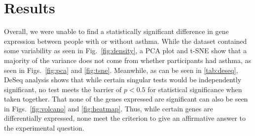 \documentclass[pdflatex,sn-mathphys]{sn-jnl}%
\theoremstyle{thmstyleone}%
\theoremstyle{thmstyletwo}%
\newcommand{\betterref}[1]{\IfBeginWith{#1}{fig:}{Fig.~}{Table~}\ref{#1}}
\theoremstyle{thmstylethree}%
\begin{document}
\section{Results}\label{sec3}
Overall, we were unable to find a statistically significant difference in gene expression between people with or without asthma. While the dataset contained some variability as seen in Fig.~\ref{fig:density}, a PCA plot and t-SNE show that a majority of the variance does not come from whether participants had asthma, as seen in Figs.~\ref{fig:pca} and \ref{fig:tsne}.  Meanwhile, as can be seen in \betterref{tab:deseq}, DeSeq analysis shows that while certain singular tests would be independently significant, no test meets the barrier of $p < 0.5$ for statistical significance when taken together. That none of the genes expressed are significant can also be seen in Figs.~\ref{fig:volcano} and \ref{fig:heatmap}. Thus, while certain genes are differentially expressed, none meet the criterion to give an affirmative answer to the experimental question. \\
\begin{table}[H]
    \centering
    \caption{DeSeq data showing statistical significance of the most differentially expressed genes.}
    \label{tab:deseq}
\end{table}
\end{document}
